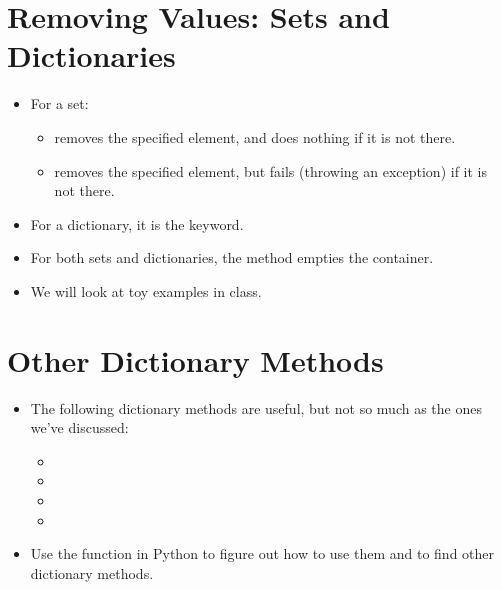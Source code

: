 \documentclass[letterpaper,10pt,english]{sphinxmanual}
\begin{document}
\section{Removing Values: Sets and Dictionaries}
\label{\detokenize{lecture_notes/lec16_dictionaries1:removing-values-sets-and-dictionaries}}\begin{itemize}
\item {} 
For a set:
\begin{itemize}
\item {} 
 removes the specified element, and does nothing if it
is not there.

\item {} 
 removes the specified element, but fails (throwing an
exception) if it is not there.

\end{itemize}

\item {} 
For a dictionary, it is the  keyword.

\item {} 
For both sets and dictionaries, the  method empties the
container.

\item {} 
We will look at toy examples in class.

\end{itemize}


\section{Other Dictionary Methods}
\label{\detokenize{lecture_notes/lec16_dictionaries1:other-dictionary-methods}}\begin{itemize}
\item {} 
The following dictionary methods are useful, but not so much as the
ones we’ve discussed:
\begin{itemize}
\item {} 

\item {} 

\item {} 

\item {} 

\end{itemize}

\item {} 
Use the  function in Python to figure out how to use them and
to find other dictionary methods.

\end{itemize}
\end{document}

